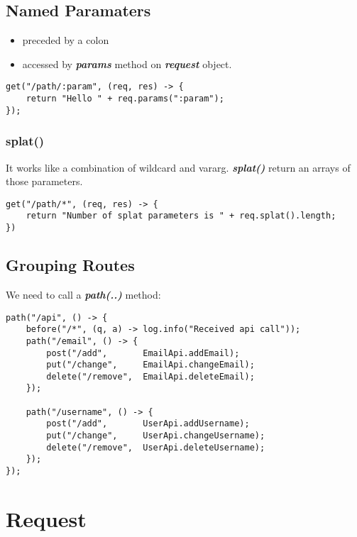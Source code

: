 \documentclass{report}
\begin{document}
\chapter{Named Paramaters}
\begin{itemize}
	\item preceded by a colon
	\item accessed by \textbf{\textit{params}} method on \textbf{\textit{request}} object. 
\end{itemize}
\begin{verbatim}
get("/path/:param", (req, res) -> {
    return "Hello " + req.params(":param");
});
\end{verbatim}


\section{splat()}
It works like a combination of wildcard and vararg. \textbf{\textit{splat()}} return an arrays of those parameters.
\begin{verbatim}
get("/path/*", (req, res) -> {
    return "Number of splat parameters is " + req.splat().length;
})
\end{verbatim}


\chapter{Grouping Routes}
We need to call a \textbf{\textit{path(..)}} method:

\begin{verbatim}
path("/api", () -> {
    before("/*", (q, a) -> log.info("Received api call"));
    path("/email", () -> {
        post("/add",       EmailApi.addEmail);
        put("/change",     EmailApi.changeEmail);
        delete("/remove",  EmailApi.deleteEmail);
    });

    path("/username", () -> {
        post("/add",       UserApi.addUsername);
        put("/change",     UserApi.changeUsername);
        delete("/remove",  UserApi.deleteUsername);
    });
});
\end{verbatim}




\part{Request}
\end{document}
